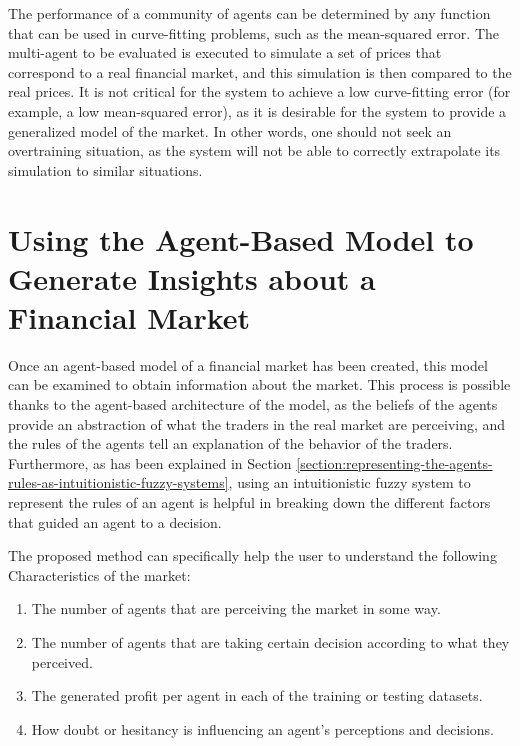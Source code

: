 The performance of a community of agents can be determined by any function that
can be used in curve-fitting problems, such as the mean-squared error. The
multi-agent to be evaluated is executed to simulate a set of prices that
correspond to a real financial market, and this simulation is then compared to
the real prices. It is not critical for the system to achieve a low
curve-fitting error (for example, a low mean-squared error), as it is desirable
for the system to provide a generalized model of the market. In other words, one
should not seek an overtraining situation, as the system will not be able to
correctly extrapolate its simulation to similar situations.

\section{Using the Agent-Based Model to Generate Insights about a Financial
Market}
\label{section:using-the-agent-based-model-to-generate-insights-about-a-financial-market}

Once an agent-based model of a financial market has been created, this model can
be examined to obtain information about the market. This process is possible
thanks to the agent-based architecture of the model, as the beliefs of the
agents provide an abstraction of what the traders in the real market are
perceiving, and the rules of the agents tell an explanation of the behavior of
the traders. Furthermore, as has been explained in Section
\ref{section:representing-the-agents-rules-as-intuitionistic-fuzzy-systems},
using an intuitionistic fuzzy system to represent the rules of an agent is
helpful in breaking down the different factors that guided an agent to a
decision.

The proposed method can specifically help the user to understand the following
Characteristics of the market:

\begin{enumerate}
\item \label{item:agents-perception} The number of agents that are perceiving
  the market in some way.
\item \label{item:agents-decisions} The number of agents that are taking certain
  decision according to what they perceived.
\item \label{item:agents-profit} The generated profit per agent in each of the
  training or testing datasets.
\item \label{item:agents-doubt} How doubt or hesitancy is influencing an agent's
  perceptions and decisions.
\end{enumerate}

